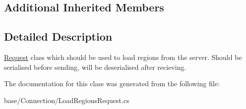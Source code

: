 \subsection*{Additional Inherited Members}


\subsection{Detailed Description}
\hyperlink{classCore_1_1Connections_1_1Request}{Request} class which should be used to load regions from the server. Should be serialised before sending, will be deserialised after recieving. 



The documentation for this class was generated from the following file\-:\begin{DoxyCompactItemize}
\item 
base/\-Connection/Load\-Regions\-Request.\-cs\end{DoxyCompactItemize}

